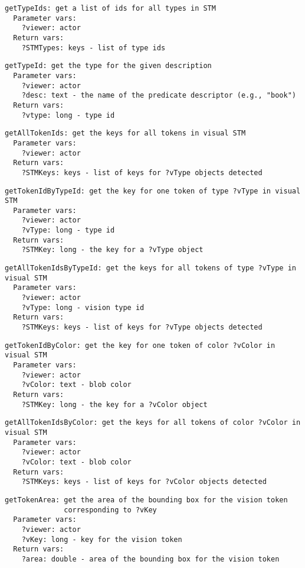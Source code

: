 \documentclass[11pt,letterpaper]{article}
\begin{document}
\begin{Verbatim}
getTypeIds: get a list of ids for all types in STM
  Parameter vars:
    ?viewer: actor
  Return vars:
    ?STMTypes: keys - list of type ids
\end{Verbatim}

\begin{Verbatim}
getTypeId: get the type for the given description
  Parameter vars:
    ?viewer: actor
    ?desc: text - the name of the predicate descriptor (e.g., "book")
  Return vars:
    ?vtype: long - type id
\end{Verbatim}

\begin{Verbatim}
getAllTokenIds: get the keys for all tokens in visual STM
  Parameter vars:
    ?viewer: actor
  Return vars:
    ?STMKeys: keys - list of keys for ?vType objects detected
\end{Verbatim}

\begin{Verbatim}
getTokenIdByTypeId: get the key for one token of type ?vType in visual STM
  Parameter vars:
    ?viewer: actor
    ?vType: long - type id
  Return vars:
    ?STMKey: long - the key for a ?vType object
\end{Verbatim}

\begin{Verbatim}
getAllTokenIdsByTypeId: get the keys for all tokens of type ?vType in visual STM
  Parameter vars:
    ?viewer: actor
    ?vType: long - vision type id
  Return vars:
    ?STMKeys: keys - list of keys for ?vType objects detected
\end{Verbatim}

\begin{Verbatim}
getTokenIdByColor: get the key for one token of color ?vColor in visual STM
  Parameter vars:
    ?viewer: actor
    ?vColor: text - blob color
  Return vars:
    ?STMKey: long - the key for a ?vColor object
\end{Verbatim}

\begin{Verbatim}
getAllTokenIdsByColor: get the keys for all tokens of color ?vColor in visual STM
  Parameter vars:
    ?viewer: actor
    ?vColor: text - blob color
  Return vars:
    ?STMKeys: keys - list of keys for ?vColor objects detected
\end{Verbatim}

\begin{Verbatim}
getTokenArea: get the area of the bounding box for the vision token
              corresponding to ?vKey
  Parameter vars:
    ?viewer: actor
    ?vKey: long - key for the vision token
  Return vars:
    ?area: double - area of the bounding box for the vision token
\end{Verbatim}
\end{document}
